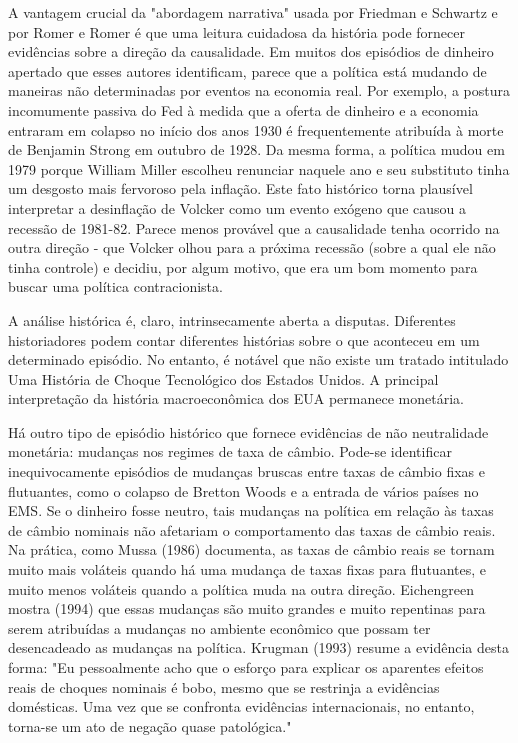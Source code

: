 \documentclass[12pt]{article}
\begin{document}
A vantagem crucial da "abordagem narrativa" usada por Friedman e Schwartz e por Romer e Romer é que uma leitura cuidadosa da história pode fornecer evidências sobre a direção da causalidade. Em muitos dos episódios de dinheiro apertado que esses autores identificam, parece que a política está mudando de maneiras não determinadas por eventos na economia real. Por exemplo, a postura incomumente passiva do Fed à medida que a oferta de dinheiro e a economia entraram em colapso no início dos anos 1930 é frequentemente atribuída à morte de Benjamin Strong em outubro de 1928. Da mesma forma, a política mudou em 1979 porque William Miller escolheu renunciar naquele ano e seu substituto tinha um desgosto mais fervoroso pela inflação. Este fato histórico torna plausível interpretar a desinflação de Volcker como um evento exógeno que causou a recessão de 1981-82. Parece menos provável que a causalidade tenha ocorrido na outra direção - que Volcker olhou para a próxima recessão (sobre a qual ele não tinha controle) e decidiu, por algum motivo, que era um bom momento para buscar uma política contracionista.

A análise histórica é, claro, intrinsecamente aberta a disputas. Diferentes historiadores podem contar diferentes histórias sobre o que aconteceu em um determinado episódio. No entanto, é notável que não existe um tratado intitulado Uma História de Choque Tecnológico dos Estados Unidos. A principal interpretação da história macroeconômica dos EUA permanece monetária.

Há outro tipo de episódio histórico que fornece evidências de não neutralidade monetária: mudanças nos regimes de taxa de câmbio. Pode-se identificar inequivocamente episódios de mudanças bruscas entre taxas de câmbio fixas e flutuantes, como o colapso de Bretton Woods e a entrada de vários países no EMS. Se o dinheiro fosse neutro, tais mudanças na política em relação às taxas de câmbio nominais não afetariam o comportamento das taxas de câmbio reais. Na prática, como Mussa (1986) documenta, as taxas de câmbio reais se tornam muito mais voláteis quando há uma mudança de taxas fixas para flutuantes, e muito menos voláteis quando a política muda na outra direção. Eichengreen mostra (1994) que essas mudanças são muito grandes e muito repentinas para serem atribuídas a mudanças no ambiente econômico que possam ter desencadeado as mudanças na política. Krugman (1993) resume a evidência desta forma: "Eu pessoalmente acho que o esforço para explicar os aparentes efeitos reais de choques nominais é bobo, mesmo que se restrinja a evidências domésticas. Uma vez que se confronta evidências internacionais, no entanto, torna-se um ato de negação quase patológica."
\end{document}
